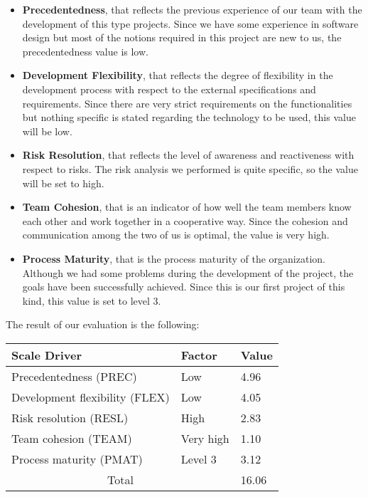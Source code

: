 \begin{itemize}
	\item \textbf{Precedentedness}, that reflects the previous experience of our team with the development of this type projects. Since we have some experience in software design but most of the notions required in this project are new to us, the precedentedness value is low.
	\item \textbf{Development Flexibility}, that reflects the degree of flexibility in the development process with respect to the external specifications and requirements. Since there are very strict requirements on the functionalities but nothing specific is stated regarding the technology to be used, this value will be low.
	\item \textbf{Risk Resolution}, that reflects the level of awareness and reactiveness with respect to risks. The risk analysis we performed is quite specific, so the value will be set to high.
	\item \textbf{Team Cohesion}, that is an indicator of how well the team members know each other and work together in a cooperative way. Since the cohesion and communication among the two of us is optimal, the value is very high.
	\item \textbf{Process Maturity}, that is the process maturity of the organization. Although we had some problems during the development of the project, the goals have been successfully achieved. Since this is our first project of this kind, this value is set to level 3.
\end{itemize}

The result of our evaluation is the following:
\begin{table}[H]
	\centering
	\begin{tabular}{| m{5.8cm} | m{1.8cm} | m{1.2cm} |}
		\hline
		\textbf{Scale Driver} & \textbf{Factor}& \textbf{Value} \\
		\hline
		Precedentedness (PREC) & Low & 4.96 \\
		Development flexibility (FLEX) & Low & 4.05 \\
		Risk resolution (RESL) & High & 2.83 \\
		Team cohesion (TEAM) & Very high & 1.10 \\
		Process maturity (PMAT) & Level 3 & 3.12 \\
		\hline
		\multicolumn{2}{|c|}{Total} & 16.06\\
		\hline
	\end{tabular}
\end{table}

